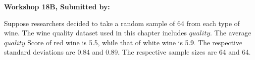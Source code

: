 \documentclass[11pt]{book}\usepackage[]{graphicx}\usepackage[]{color}
\begin{document}
\begin{exercises}
\begin{exercise}
\end{exercise}
\begin{solution}  %


\end{solution}

\clearpage

    \begin{exercise}  %



    \begin{center}
\begin{flushleft}\textbf{\large \hfill Workshop 18B, Submitted by: }\end{flushleft}

\end{center}

Suppose researchers decided to take a random sample of 64 from each type of wine.  The wine quality dataset used in this chapter includes $quality$. The average $quality$ Score of red wine is 5.5, while that of white wine is 5.9. The respective standard deviations are 0.84 and 0.89. The respective sample sizes are 64 and 64.


\end{exercise}
\end{exercises}
\end{document}
